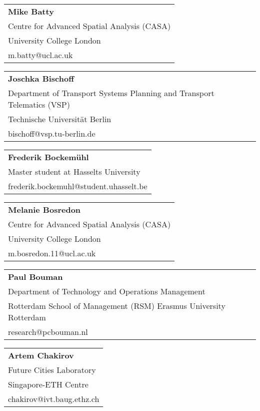 \begin{tabular}[width=0.48\textwidth]{@{}l}
\textbf{Mike Batty} \\
Centre for Advanced Spatial Analysis (CASA) \\
University College London \\
m.batty@ucl.ac.uk \\
\end{tabular}

\begin{tabular}[width=0.48\textwidth]{@{}l}
\textbf{Joschka Bischoff} \\
Department of Transport Systems Planning and Transport Telematics (VSP) \\
Technische Universität Berlin \\
bischoff@vsp.tu-berlin.de \\
\end{tabular}

\begin{tabular}[width=0.48\textwidth]{@{}l}
\textbf{Frederik Bockemühl} \\
Master student at Hasselts University \\
frederik.bockemuhl@student.uhasselt.be \\
\end{tabular}

\begin{tabular}[width=0.48\textwidth]{@{}l}
\textbf{Melanie Bosredon} \\
Centre for Advanced Spatial Analysis (CASA) \\
University College London \\
m.bosredon.11@ucl.ac.uk \\
\end{tabular}

\begin{tabular}[width=0.48\textwidth]{@{}l}
\textbf{Paul Bouman} \\
Department of Technology and Operations Management \\
Rotterdam School of Management (RSM) Erasmus University Rotterdam \\
research@pcbouman.nl \\
\end{tabular}

\begin{tabular}[width=0.48\textwidth]{@{}l}
\textbf{Artem Chakirov} \\
Future Cities Laboratory \\
Singapore-ETH Centre\\
chakirov@ivt.baug.ethz.ch \\
\end{tabular}

